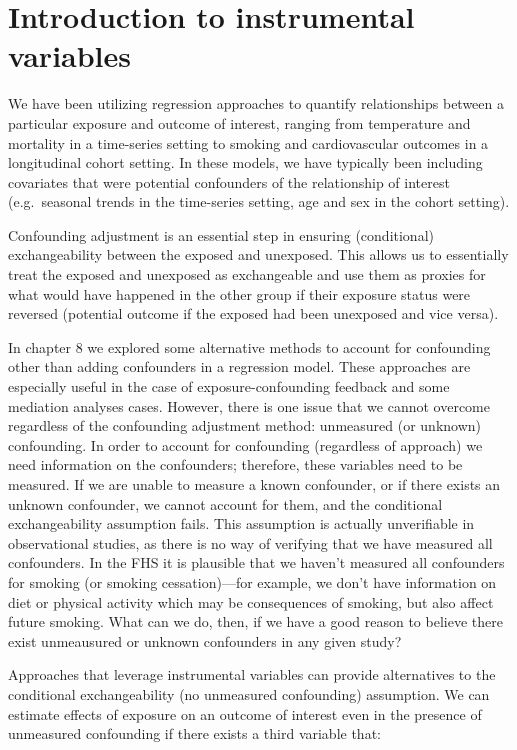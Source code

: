 \documentclass[
]{book}
\begin{document}
\section{Introduction to instrumental variables}\label{introduction-to-instrumental-variables}

We have been utilizing regression approaches to quantify relationships between
a particular exposure and outcome of interest, ranging from temperature and mortality in a time-series setting to smoking and cardiovascular outcomes in a longitudinal cohort setting. In these models, we have typically been including covariates that were potential confounders of the relationship of interest (e.g.~seasonal trends in the time-series setting, age and sex in the cohort setting).

Confounding adjustment is an essential step in ensuring (conditional) exchangeability between the exposed and unexposed. This allows us to essentially treat the exposed and unexposed as exchangeable and use them as proxies for what would have happened in the other group if their exposure status were reversed (potential outcome if the exposed had been unexposed and vice versa).

In chapter 8 we explored some alternative methods to account for confounding other
than adding confounders in a regression model. These approaches are especially
useful in the case of exposure-confounding feedback and some mediation analyses
cases. However, there is one issue that we cannot overcome regardless of the confounding adjustment method: unmeasured (or unknown) confounding. In order to account for confounding (regardless of approach) we need information on the confounders; therefore, these variables need to be measured. If we are unable to measure a known confounder, or if there exists an unknown confounder, we cannot account for them, and the conditional exchangeability assumption fails. This assumption is actually unverifiable in observational studies, as there is no way of verifying that we have measured all confounders. In the FHS it is plausible that we haven't measured all confounders for smoking (or smoking cessation)---for example, we don't have information on diet or physical activity which may be consequences of smoking, but also affect future smoking. What can we do, then, if we have a good reason to believe there exist unmeausured or unknown confounders in any given study?

Approaches that leverage instrumental variables can provide alternatives to the conditional exchangeability (no unmeasured confounding) assumption. We can estimate effects of exposure on an outcome of interest even in the presence of unmeasured confounding if there exists a third variable that:
\end{document}
